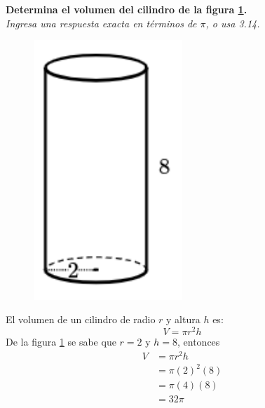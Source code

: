 \textbf{Determina el volumen del cilindro de la figura
    \ref{fig:vol_cil_09}.}\\
\textit{Ingresa una respuesta exacta en términos de $\pi$, o usa 3.14.}\\

\begin{minipage}[t]{0.3\linewidth}
    \begin{figure}[H]
        \centering
        \includegraphics[width=0.5\textwidth]{../images/vol_cil_09.png}
        \caption{}
        \label{fig:vol_cil_09}
    \end{figure}
\end{minipage}%
\begin{minipage}[t]{0.7\linewidth}
    \begin{solutionbox}{5cm}        El volumen de un cilindro de radio $r$ y altura $h$ es:
        \begin{equation*}
            V = \pi r^2 h
        \end{equation*}
        De la figura \ref{fig:vol_cil_09} se sabe que $r=2$ y $h=8$, entonces
        \begin{equation*}
            \begin{split}
                V & = \pi r^2 h\\
                & = \pi (2)^2 (8)\\
                & = \pi (4) (8)\\
                & = 32\pi
            \end{split}
        \end{equation*}
    \end{solutionbox}
\end{minipage}%
